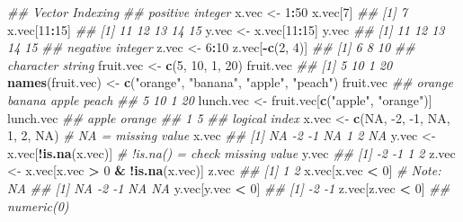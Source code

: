\documentclass[
]{book}
\newenvironment{Shaded}{\begin{snugshade}}{\end{snugshade}}
\newcommand{\CommentTok}[1]{\textcolor[rgb]{0.56,0.35,0.01}{\textit{#1}}}
\newcommand{\DecValTok}[1]{\textcolor[rgb]{0.00,0.00,0.81}{#1}}
\newcommand{\KeywordTok}[1]{\textcolor[rgb]{0.13,0.29,0.53}{\textbf{#1}}}
\newcommand{\NormalTok}[1]{#1}
\newcommand{\OperatorTok}[1]{\textcolor[rgb]{0.81,0.36,0.00}{\textbf{#1}}}
\newcommand{\OtherTok}[1]{\textcolor[rgb]{0.56,0.35,0.01}{#1}}
\newcommand{\StringTok}[1]{\textcolor[rgb]{0.31,0.60,0.02}{#1}}
\begin{document}
\begin{Shaded}
\begin{Highlighting}[]
\CommentTok{\#\# Vector Indexing}
\CommentTok{\#\# positive integer}
\NormalTok{x.vec \textless{}{-}}\StringTok{ }\DecValTok{1}\OperatorTok{:}\DecValTok{50}
\NormalTok{x.vec[}\DecValTok{7}\NormalTok{]}
\CommentTok{\#\# [1] 7}
\NormalTok{x.vec[}\DecValTok{11}\OperatorTok{:}\DecValTok{15}\NormalTok{]}
\CommentTok{\#\# [1] 11 12 13 14 15}
\NormalTok{y.vec \textless{}{-}}\StringTok{ }\NormalTok{x.vec[}\DecValTok{11}\OperatorTok{:}\DecValTok{15}\NormalTok{]}
\NormalTok{y.vec}
\CommentTok{\#\# [1] 11 12 13 14 15}
\CommentTok{\#\# negative integer}
\NormalTok{z.vec \textless{}{-}}\StringTok{ }\DecValTok{6}\OperatorTok{:}\DecValTok{10}
\NormalTok{z.vec[}\OperatorTok{{-}}\KeywordTok{c}\NormalTok{(}\DecValTok{2}\NormalTok{, }\DecValTok{4}\NormalTok{)]}
\CommentTok{\#\# [1]  6  8 10}
\CommentTok{\#\# character string}
\NormalTok{fruit.vec \textless{}{-}}\StringTok{ }\KeywordTok{c}\NormalTok{(}\DecValTok{5}\NormalTok{, }\DecValTok{10}\NormalTok{, }\DecValTok{1}\NormalTok{, }\DecValTok{20}\NormalTok{)}
\NormalTok{fruit.vec}
\CommentTok{\#\# [1]  5 10  1 20}
\KeywordTok{names}\NormalTok{(fruit.vec) \textless{}{-}}\StringTok{ }\KeywordTok{c}\NormalTok{(}\StringTok{"orange"}\NormalTok{, }\StringTok{"banana"}\NormalTok{, }\StringTok{"apple"}\NormalTok{, }\StringTok{"peach"}\NormalTok{)}
\NormalTok{fruit.vec}
\CommentTok{\#\# orange banana  apple  peach }
\CommentTok{\#\#      5     10      1     20}
\NormalTok{lunch.vec  \textless{}{-}}\StringTok{  }\NormalTok{fruit.vec[}\KeywordTok{c}\NormalTok{(}\StringTok{"apple"}\NormalTok{, }\StringTok{"orange"}\NormalTok{)]}
\NormalTok{lunch.vec}
\CommentTok{\#\#  apple orange }
\CommentTok{\#\#      1      5}
\CommentTok{\#\# logical index}
\NormalTok{x.vec \textless{}{-}}\StringTok{ }\KeywordTok{c}\NormalTok{(}\OtherTok{NA}\NormalTok{, }\DecValTok{{-}2}\NormalTok{, }\DecValTok{{-}1}\NormalTok{, }\OtherTok{NA}\NormalTok{, }\DecValTok{1}\NormalTok{, }\DecValTok{2}\NormalTok{, }\OtherTok{NA}\NormalTok{) }\CommentTok{\# NA = missing value}
\NormalTok{x.vec}
\CommentTok{\#\# [1] NA {-}2 {-}1 NA  1  2 NA}
\NormalTok{y.vec \textless{}{-}}\StringTok{ }\NormalTok{x.vec[}\OperatorTok{!}\KeywordTok{is.na}\NormalTok{(x.vec)] }\CommentTok{\# !is.na() = check missing value}
\NormalTok{y.vec}
\CommentTok{\#\# [1] {-}2 {-}1  1  2}
\NormalTok{z.vec \textless{}{-}}\StringTok{ }\NormalTok{x.vec[x.vec }\OperatorTok{\textgreater{}}\StringTok{ }\DecValTok{0} \OperatorTok{\&}\StringTok{ }\OperatorTok{!}\KeywordTok{is.na}\NormalTok{(x.vec)]}
\NormalTok{z.vec}
\CommentTok{\#\# [1] 1 2}
\NormalTok{x.vec[x.vec }\OperatorTok{\textless{}}\StringTok{ }\DecValTok{0}\NormalTok{] }\CommentTok{\# Note: NA}
\CommentTok{\#\# [1] NA {-}2 {-}1 NA NA}
\NormalTok{y.vec[y.vec }\OperatorTok{\textless{}}\StringTok{ }\DecValTok{0}\NormalTok{]}
\CommentTok{\#\# [1] {-}2 {-}1}
\NormalTok{z.vec[z.vec }\OperatorTok{\textless{}}\StringTok{ }\DecValTok{0}\NormalTok{]}
\CommentTok{\#\# numeric(0)}
\end{Highlighting}
\end{Shaded}
\end{document}
